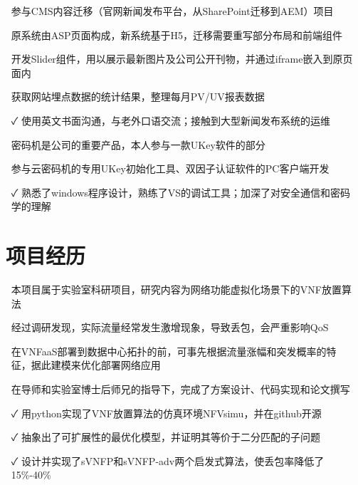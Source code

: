 \documentclass[14pt]{resume}
\begin{document}
\begin{itemize}
    \item[\faFlagO] 参与CMS内容迁移（官网新闻发布平台，从SharePoint迁移到AEM）项目
    \item[\faFlagO] 原系统由ASP页面构成，新系统基于H5，迁移需要重写部分布局和前端组件
    \item[\faCode] 开发Slider组件，用以展示最新图片及公司公开刊物，并通过iframe嵌入到原页面内
    \item[\faCode] 获取网站埋点数据的统计结果，整理每月PV/UV报表数据
    \item[\faCheck] 使用英文书面沟通，与老外口语交流；接触到大型新闻发布系统的运维
\end{itemize}

\begin{itemize}
    \item[\faFlagO] 密码机是公司的重要产品，本人参与一款UKey软件的\textbf{\color{red}{windows开发}}部分
    \item[\faCode] 参与云密码机的专用UKey初始化工具、双因子认证软件的PC客户端开发
    \item[\faCheck] 熟悉了windows程序设计，熟练了VS的调试工具；加深了对安全通信和密码学的理解
\end{itemize}

\section{\faUsers\ 项目经历}

\begin{onehalfspacing}
\begin{itemize}
    \item[\faFlagO] 本项目属于实验室科研项目，研究内容为网络功能虚拟化场景下的VNF放置算法
    \item[\faFlagO] 经过调研发现，实际流量经常发生激增现象，导致丢包，会严重影响QoS
    \item[\faFlagO] 在VNFaaS部署到数据中心拓扑的前，可事先根据流量涨幅和突发概率的特征，据此建模来优化部署网络应用
    \item[\faCode] 在导师和实验室博士后师兄的指导下，完成了方案设计、代码实现和论文撰写
    \item[\faCheck] 用python实现了VNF放置算法的仿真环境NFVsimu，并在github开源
    \item[\faCheck] 抽象出了可扩展性的最优化模型，并证明其等价于二分匹配的子问题
    \item[\faCheck] 设计并实现了sVNFP和sVNFP-adv两个启发式算法，使丢包率降低了15\%-40\%
\end{itemize}
\end{onehalfspacing}
\end{document}
